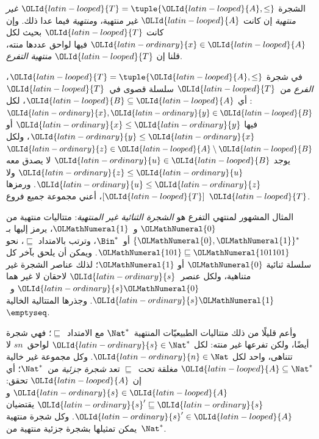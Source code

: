 \documentclass[../../../include/open-logic-section]{subfiles}
\begin{document}
\begin{defn}
الشجرة ${\OLId{latin-looped}{T}} = \tuple{{\OLId{latin-looped}{A}}, \le}$ \emph{غير منتهية} إن كانت ${\OLId{latin-looped}{A}}$ غير
منتهية، و\emph{منتهية} فيما عدا ذلك. وإن كانت ${\OLId{latin-looped}{T}}$ بحيث لكل ${\OLId{latin-ordinary}{x}} \in {\OLId{latin-looped}{A}}$ فيها
لواحق عددها منته، قلنا إن ${\OLId{latin-looped}{T}}$ \emph{منتهية التفرع}.
\end{defn}

\begin{defn}[الفروع]
في شجرة ${\OLId{latin-looped}{T}} = \tuple{{\OLId{latin-looped}{A}}, \le}$، \emph{الفرع} من~${\OLId{latin-looped}{T}}$ سلسلة قصوى في~${\OLId{latin-looped}{T}}$:
أي ${\OLId{latin-looped}{B}} \subseteq {\OLId{latin-looped}{A}}$، لكل ${\OLId{latin-ordinary}{x}}, {\OLId{latin-ordinary}{y}} \in {\OLId{latin-looped}{B}}$ فيها ${\OLId{latin-ordinary}{x}} \le {\OLId{latin-ordinary}{y}}$ أو ${\OLId{latin-ordinary}{y}} \le {\OLId{latin-ordinary}{x}}$،
ولكل ${\OLId{latin-ordinary}{z}} \in {\OLId{latin-looped}{A}} \setminus {\OLId{latin-looped}{B}}$ يوجد ${\OLId{latin-ordinary}{u}} \in {\OLId{latin-looped}{B}}$ لا يصدق معه ${\OLId{latin-ordinary}{z}} \le {\OLId{latin-ordinary}{u}}$
ولا ${\OLId{latin-ordinary}{u}} \le {\OLId{latin-ordinary}{z}}$.
%
ورمزها $[{\OLId{latin-looped}{T}}]$، أعني مجموعة جميع فروع ${\OLId{latin-looped}{T}}$.
\end{defn}

\begin{ex}
المثال المشهور لمنتهي التفرع هو \emph{الشجرة الثنائية غير المنتهية}:
متتاليات منتهية من ${\OLMathNumeral{0}}$ و~${\OLMathNumeral{1}}$، يرمز إليها بـ$\{{\OLMathNumeral{0}},{\OLMathNumeral{1}}\}^*$ أو~$\Bin^*$،
وترتب بالامتداد $\sqsubseteq$، نحو ${\OLMathNumeral{101}} \sqsubseteq {\OLMathNumeral{101101}}$.
ويمكن أن يلحق بآخر كل سلسلة ثنائية ${\OLMathNumeral{0}}$ أو ${\OLMathNumeral{1}}$؛ لذلك عناصر الشجرة
غير متناهية، ولكل عنصر~${\OLId{latin-ordinary}{s}}$ لاحقان لا غير هما ${\OLId{latin-ordinary}{s}}{\OLMathNumeral{0}}$ و~${\OLId{latin-ordinary}{s}}{\OLMathNumeral{1}}$.
وجذرها المتتالية الخالية $\emptyseq$.
\end{ex}

\begin{ex}
وأعم قليلًا من ذلك متتاليات الطبيعيّات المنتهية~$\Nat^*$ مع
الامتداد~$\sqsubseteq$؛ فهي شجرة أيضًا، ولكن تفرعها غير منته:
لكل ${\OLId{latin-ordinary}{s}} \in \Nat^*$ لواحق~$sn$ لا تتناهى، واحد لكل ${\OLId{latin-ordinary}{n}} \in \Nat$.
وكل مجموعة غير خالية ${\OLId{latin-looped}{A}} \subseteq \Nat^*$ مغلقة تحت~$\sqsubseteq$ تعد
\emph{شجرة جزئية} من~$\Nat^*$؛ أي إن ${\OLId{latin-looped}{A}}$ تحقق: ${\OLId{latin-ordinary}{s}} \in {\OLId{latin-looped}{A}}$ و${\OLId{latin-ordinary}{s}}' \sqsubseteq {\OLId{latin-ordinary}{s}}$
يقتضيان ${\OLId{latin-ordinary}{s}}' \in {\OLId{latin-looped}{A}}$. وكل شجرة منتهية يمكن تمثيلها بشجرة جزئية
منتهية من~$\Nat^*$.
\end{ex}
\end{document}
